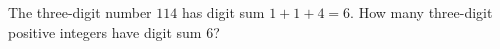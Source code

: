 The three-digit number $114$ has digit sum $1+1+4=6$. How many three-digit positive integers have digit sum $6$?
